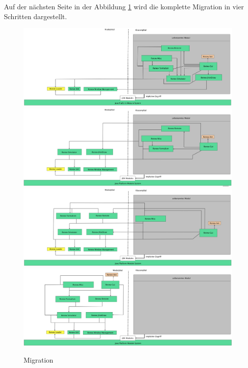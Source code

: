	Auf der nächsten Seite in der Abbildung \ref{fig:migration} wird die komplette Migration in vier Schritten dargestellt.
	\begin{figure}
	  \centering
	  \includegraphics[width=\textwidth]{material/images/1step.png}
	  \includegraphics[width=\textwidth]{material/images/2step.png}
	  \includegraphics[width=\textwidth]{material/images/3step.png}
	  \includegraphics[width=\textwidth]{material/images/4step.png}
	  \caption{Migration}
	  \label{fig:migration}
	\end{figure}	

